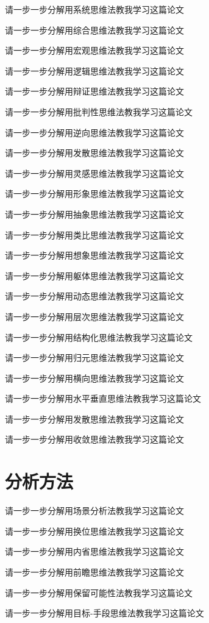 \documentclass[12pt]{book}
\begin{document}
请一步一步分解用系统思维法教我学习这篇论文


请一步一步分解用综合思维法教我学习这篇论文


请一步一步分解用宏观思维法教我学习这篇论文


请一步一步分解用逻辑思维法教我学习这篇论文


请一步一步分解用辩证思维法教我学习这篇论文


请一步一步分解用批判性思维法教我学习这篇论文


请一步一步分解用逆向思维法教我学习这篇论文


请一步一步分解用发散思维法教我学习这篇论文


请一步一步分解用灵感思维法教我学习这篇论文


请一步一步分解用形象思维法教我学习这篇论文


请一步一步分解用抽象思维法教我学习这篇论文


请一步一步分解用类比思维法教我学习这篇论文


请一步一步分解用想象思维法教我学习这篇论文


请一步一步分解用躯体思维法教我学习这篇论文

请一步一步分解用动态思维法教我学习这篇论文

请一步一步分解用层次思维法教我学习这篇论文

请一步一步分解用结构化思维法教我学习这篇论文

请一步一步分解用归元思维法教我学习这篇论文

请一步一步分解用横向思维法教我学习这篇论文

请一步一步分解用水平垂直思维法教我学习这篇论文

请一步一步分解用发散思维法教我学习这篇论文

请一步一步分解用收敛思维法教我学习这篇论文

\section{分析方法}

请一步一步分解用场景分析法教我学习这篇论文

请一步一步分解用换位思维法教我学习这篇论文

请一步一步分解用内省思维法教我学习这篇论文

请一步一步分解用前瞻思维法教我学习这篇论文

请一步一步分解用保留可能性法教我学习这篇论文

请一步一步分解用目标-手段思维法教我学习这篇论文
\end{document}
